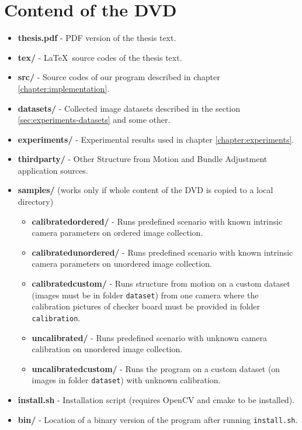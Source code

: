 \chapter{Contend of the DVD}
\begin{itemize}
	\item \textbf{thesis.pdf} - PDF version of the thesis text.
	\item \textbf{tex/} - \LaTeX ~source codes of the thesis text.
	\item \textbf{src/} - Source codes of our program described in chapter \ref{chapter:implementation}.
	\item \textbf{datasets/} - Collected image datasets described in the section \ref{sec:experiments-datasets} and some other.
	\item \textbf{experiments/} - Experimental results used in chapter \ref{chapter:experiments}.
	\item \textbf{third\textunderscore party/} - Other Structure from Motion and Bundle Adjustment application sources.
	\item \textbf{samples/} (works only if whole content of the DVD is copied to a local directory)
	\begin{itemize}
		\item \textbf{calibrated\textunderscore ordered/} - Runs predefined scenario with known intrinsic camera parameters on ordered image collection.
		\item \textbf{calibrated\textunderscore unordered/} - Runs predefined scenario with known intrinsic camera parameters on unordered image collection.
		\item \textbf{calibrated\textunderscore custom/} - Runs structure from motion on a custom dataset (images must be in folder \texttt{dataset}) from one camera where the calibration pictures of checker board must be provided in folder \texttt{calibration}.
		\item \textbf{uncalibrated/} - Runs predefined scenario with unknown camera calibration on unordered image collection.
		\item \textbf{uncalibrated\textunderscore custom/} - Runs the program on a custom dataset (on images in folder \texttt{dataset}) with unknown calibration.
	\end{itemize}
	\item \textbf{install.sh} - Installation script (requires OpenCV and cmake to be installed).
	\item \textbf{bin/} - Location of a binary version of the program after running \texttt{install.sh}.
\end{itemize}
